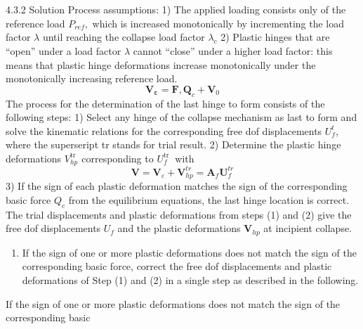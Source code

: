 \hypertarget{section}{%
\section{}\label{section}}

4.3.2 Solution Process assumptions: 1) The applied loading consists only
of the reference load \(P_{r e f},\) which is increased monotonically by
incrementing the load factor \(\lambda\) until reaching the collapse
load factor \(\lambda_{c}\) 2) Plastic hinges that are ``open'' under a
load factor \(\lambda\) cannot ``close'' under a higher load factor:
this means that plastic hinge deformations increase monotonically under
the monotonically increasing reference load. \[
\boldsymbol{V}_{\boldsymbol{\varepsilon}}=\mathbf{F}, \boldsymbol{Q}_{c}+\boldsymbol{V}_{0}
\] The process for the determination of the last hinge to form consists
of the following steps: 1) Select any hinge of the collapse mechanism as
last to form and solve the kinematic relations for the corresponding
free dof displacements \(U_{f}^{t}\), where the superseript tr stands
for trial result. 2) Determine the plastic hinge deformations
\(V_{h p}^{\text {tr }}\) corresponding to \(U_{f}^{\text {tr }}\) with
\[
    \boldsymbol{V}=\boldsymbol{V}_{\varepsilon}+\boldsymbol{V}_{h p}^{t r}=\mathbf{A}_{f} \boldsymbol{U}_{f}^{t r}
    \] 3) If the sign of each plastic deformation matches the sign of
the corresponding basic force \(Q_{c}\) from the equilibrium equations,
the last hinge location is correct. The trial displacements and plastic
deformations from steps (1) and (2) give the free dof displacements
\(U_{f}\) and the plastic deformations \(\boldsymbol{V}_{h p}\) at
incipient collapse.

\begin{enumerate}
\def\labelenumi{\arabic{enumi})}
\setcounter{enumi}{3}
\tightlist
\item
  If the sign of one or more plastic deformations does not match the
  sign of the corresponding basic force, correct the free dof
  displacements and plastic deformations of Step (1) and (2) in a single
  step as described in the following.
\end{enumerate}

If the sign of one or more plastic deformations does not match the sign
of the corresponding basic
